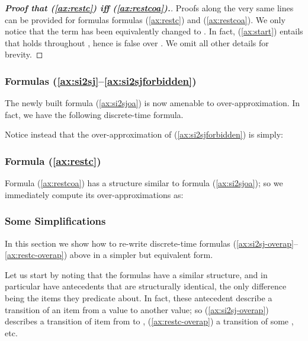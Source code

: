 \documentclass[a4paper]{article}
\newcommand{\frf}[1]{(\ref{#1})}
\newcommand{\fsrf}[2]{(\ref{#1}--\ref{#2})}
\theoremstyle{plain}
\theoremstyle{definition}
\begin{document}
\begin{proof}[\textbf{Proof that \frf{ax:restc} iff \frf{ax:restcoa}.}]
Proofs along the very same lines can be provided for formulas formulas \frf{ax:restc} and \frf{ax:restcoa}.
We only notice that the term  has been equivalently changed to .
In fact, \frf{ax:start} entails that  holds throughout , hence  is false over .
We omit all other details for brevity.
\end{proof}






\subsubsection{Formulas \fsrf{ax:si2sj}{ax:si2sjforbidden}}
The newly built formula \frf{ax:si2sjoa} is now amenable to over-ap\-prox\-i\-ma\-tion.
In fact, we have the following discrete-time formula.



Notice instead that the over-ap\-prox\-i\-ma\-tion of \frf{ax:si2sjforbidden} is simply:









\subsubsection{Formula \frf{ax:restc}}
Formula \frf{ax:restcoa} has a structure similar to formula \frf{ax:si2sjoa}; so we immediately compute its over-ap\-prox\-i\-ma\-tions as:





\subsubsection{Some Simplifications}
In this section we show how to re-write discrete-time formulas \fsrf{ax:si2sj-overap}{ax:restc-overap} above in a simpler but equivalent form.

Let us start by noting that the formulas have a similar structure, and in particular have antecedents that are structurally identical, the only difference being the items they predicate about.
In fact, these antecedent describe a transition of an item from a value to another value; so \frf{ax:si2sj-overap} describes a transition of item  from  to , \frf{ax:restc-overap} a transition of some , etc.
\end{document}
